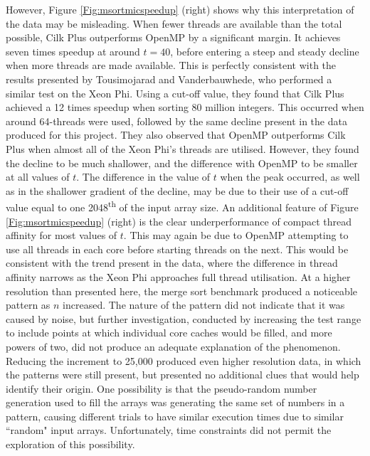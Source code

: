 \documentclass{report}
\begin{document}
However, Figure \ref{Fig:msortmicspeedup} (right) shows why this interpretation of the data may be misleading. When fewer threads are available than the total possible, Cilk Plus outperforms OpenMP by a significant margin. It achieves seven times speedup at around \(t=40\), before entering a steep and steady decline when more threads are made available. This is perfectly consistent with the results presented by Tousimojarad and Vanderbauwhede\cite{Tousimojarad14}, who performed a similar test on the Xeon Phi. Using a cut-off value, they found that Cilk Plus achieved a 12 times speedup when sorting 80 million integers. This occurred when around 64-threads were used, followed by the same decline present in the data produced for this project. They also observed that OpenMP outperforms Cilk Plus when almost all of the Xeon Phi's threads are utilised. However, they found the decline to be much shallower, and the difference with OpenMP to be smaller at all values of \(t\). The difference in the value of \(t\) when the peak occurred, as well as in the shallower gradient of the decline, may be due to their use of a cut-off value  equal to one 2048\textsuperscript{th} of the input array size. An additional feature of Figure \ref{Fig:msortmicspeedup} (right) is the clear underperformance of compact thread affinity for most values of \(t\). This may again be due to OpenMP attempting to use all threads in each core before starting threads on the next. This would be consistent with the trend present in the data, where the difference in thread affinity narrows as the Xeon Phi approaches full thread utilisation. At a higher resolution than presented here, the merge sort benchmark produced a noticeable pattern as \(n\) increased. The nature of the pattern did not indicate that it was caused by noise, but further investigation, conducted by increasing the test range to include points at which individual core caches would be filled, and more powers of two, did not produce an adequate explanation of the phenomenon. Reducing the increment to 25,000 produced even higher resolution data, in which the patterns were still present, but presented no additional clues that would help identify their origin. One possibility is that the pseudo-random number generation used to fill the arrays was generating the same set of numbers in a pattern, causing different trials to have similar execution times due to similar ``random" input arrays. Unfortunately, time constraints did not permit the exploration of this possibility.
\end{document}
